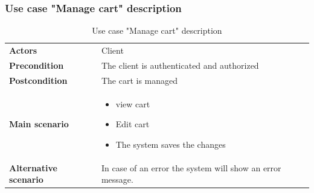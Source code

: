 \documentclass[12pt,a4paper]{report}
\begin{document}
	\subsubsection*{Use case "Manage cart" description}
	\begin{table}[H]
		\begin{center}
			\captionsetup[table]{skip=10pt}
			\caption{Use case "Manage cart" description}
			\setlength\doublerulesep{0.5pt}
			\begin{tabular}{|  p{5cm}|  p{9cm}|}
				\rowcolor{LightCyan}
				
				\hline
				\multicolumn{2}{c}{Use case "Manage cart"}\\
				\hline
				
				\textbf{Actors} &                        
				Client
				\\ \hline
				
				\textbf{Precondition} &                        
				The client is authenticated and authorized
				\\ \hline
				\textbf{Postcondition} &                        
				The cart is managed
				\\ \hline
				
				\textbf{Main scenario} &                   
				\begin{itemize}
					\item view cart
					\item Edit cart
					\item The system saves the changes
					
				\end{itemize}
				
				
				\\ \hline
				
				\textbf{Alternative scenario} &                        
				In case of an error the system will show an error message.
				\\ \hline
				
				
			\end{tabular}
			
		\end{center}
		
	\end{table}
\end{document}
